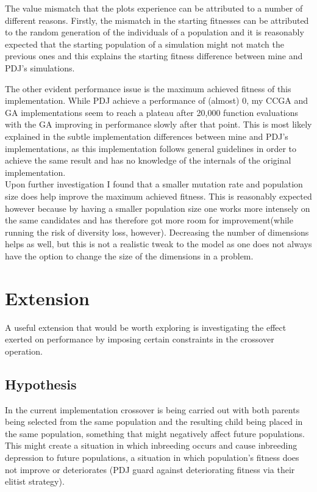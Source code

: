 \documentclass[12pt,a4paper,onecolumn]{article}
\begin{document}
The value mismatch that the plots experience can be attributed to a number of different reasons. Firstly, the mismatch in the starting fitnesses can be attributed to the random generation of the individuals of a population and it is reasonably expected that the starting population of a simulation might not match the previous ones and this explains the starting fitness difference between mine and PDJ's simulations.

The other evident performance issue is the maximum achieved fitness of this implementation. While PDJ achieve a performance of (almost) 0, my CCGA and GA implementations seem to reach a plateau after 20,000 function evaluations with the GA improving in performance slowly after that point. This is most likely explained in the subtle implementation differences between mine and PDJ's implementations, as this implementation follows general guidelines in order to achieve the same result and has no knowledge of the internals of the original implementation.\\

Upon further investigation I found that a smaller mutation rate and population size does help improve the maximum achieved fitness. This is reasonably expected however because by having a smaller population size one works more intensely on the same candidates and has therefore got more room for improvement(while running the risk of diversity loss, however). Decreasing the number of dimensions helps as well, but this is not a realistic tweak to the model as one does not always have the option to change the size of the dimensions in a problem.

\section{Extension}
A useful extension that would be worth exploring is investigating the effect exerted on performance by imposing certain constraints in the crossover operation.
\subsection{Hypothesis}
In the current implementation crossover is being carried out with both parents being selected from the same population and the resulting child being placed in the same population, something that might negatively affect future populations. This might create a situation in which inbreeding occurs and  cause inbreeding depression to future populations, a situation in which population's fitness does not improve or deteriorates (PDJ guard against deteriorating fitness via their elitist strategy). 
\end{document}
